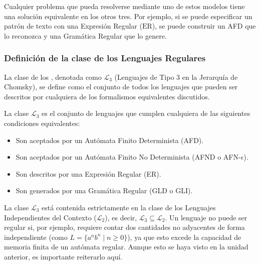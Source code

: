 Cualquier problema que pueda resolverse mediante uno de estos modelos tiene una solución equivalente en los otros tres. Por ejemplo, si se puede especificar un patrón de texto con una Expresión Regular ($\text{ER}$), se puede construir un AFD que lo reconozca y una Gramática Regular que lo genere.

\subsubsection{Definición de la clase de los Lenguajes Regulares}

La clase de los , denotada como $\mathcal{L}_3$ (Lenguajes de Tipo 3 en la Jerarquía de Chomsky), se define como el conjunto de todos los lenguajes que pueden ser descritos por cualquiera de los formalismos equivalentes discutidos.

\begin{definicion}
La clase $\mathcal{L}_3$ es el conjunto de lenguajes que cumplen cualquiera de las siguientes condiciones equivalentes:
\begin{itemize}
    \item Son aceptados por un Autómata Finito Determinista (AFD).
    \item Son aceptados por un Autómata Finito No Determinista (AFND o AFN-$\epsilon$).
    \item Son descritos por una Expresión Regular (ER).
    \item Son generados por una Gramática Regular (GLD o GLI).
\end{itemize}
\end{definicion}

La clase $\mathcal{L}_3$ está contenida estrictamente en la clase de los Lenguajes Independientes del Contexto ($\mathcal{L}_2$), es decir, $\mathcal{L}_3 \subseteq \mathcal{L}_2$. Un lenguaje no puede ser regular si, por ejemplo, requiere contar dos cantidades no adyacentes de forma independiente (como $L = \{a^n b^n \mid n \geq 0\}$), ya que esto excede la capacidad de memoria finita de un autómata regular. Aunque esto se haya visto en la unidad anterior, es importante reiterarlo aquí.


